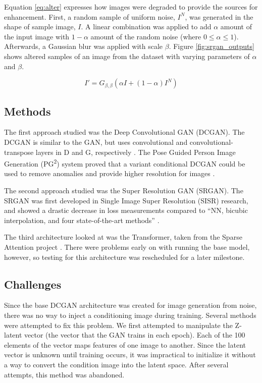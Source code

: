 \documentclass[letterpaper]{article} %
\begin{document}
Equation \ref{eq:alter} expresses how images were degraded to provide the sources for enhancement.
First, a random sample of uniform noise, $I^{N}$, was generated in the shape of
sample image, $I$. A linear combination was applied to add $\alpha$ amount of the input
image with $1 - \alpha$ amount of the random noise
(where $0 \leq \alpha \leq 1$).
Afterwards, a Gaussian blur was applied with scale $\beta$.
Figure \ref{fig:srgan_outputs} shows altered samples
of an image from the dataset with varying parameters of $\alpha$ and $\beta$.

\begin{equation}
\label{eq:alter}
I' = G_{\beta,\beta}(\alpha I + (1 - \alpha)I^{N})
\end{equation}

\subsection{Methods}
The first approach studied was the
Deep Convolutional GAN (DCGAN).
The DCGAN
is similar to the GAN,
but uses convolutional and convolutional-transpose layers in D and G, respectively
\cite{unsupervised_learning}.
The Pose Guided Person Image Generation (PG\textsuperscript{2}) system
proved that a variant conditional DCGAN could be used to
remove anomalies and provide higher resolution for images
\cite{pose_guided_image_generation}.

The second approach studied was the
Super Resolution GAN (SRGAN).
The SRGAN was first developed in
Single Image Super Resolution (SISR) research, and showed a drastic decrease in loss measurements
compared to ``NN, bicubic interpolation, and four state-of-the-art methods''
\cite{srgan}.

The third architecture looked at was the Transformer,
taken from the Sparse Attention project \cite{generative_transformers}.
There were problems early on with running the base model, however,
so testing for this architecture was rescheduled for a later milestone.

\subsection{Challenges}
Since the base DCGAN architecture was created for image generation from noise,
there was no way to inject a conditioning image during training.
Several methods were attempted to fix this problem.
We first attempted to manipulate the Z-latent vector
(the vector that the GAN trains in each epoch).
Each of the 100 elements of the vector maps features of one image to another.
Since the latent vector is unknown until training occurs,
it was impractical to initialize it without a way to convert
the condition image into the latent space.
After several attempts, this method was abandoned.
\end{document}
